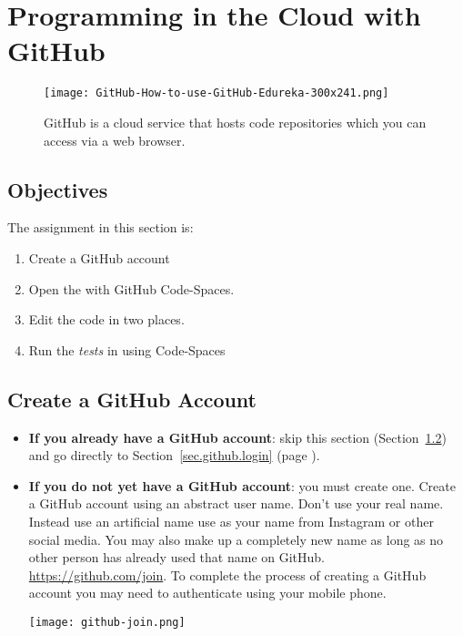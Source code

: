 \section{Programming in the Cloud with GitHub}
\label{sec.github}


\begin{figure}[h]
  \centering
  \texttt{[image: GitHub-How-to-use-GitHub-Edureka-300x241.png]}
  \caption{GitHub is a cloud service that hosts code repositories which 
    you can access via a web browser.}
\end{figure}

\subsection{Objectives}
The assignment in this section is:
\begin{enumerate}
\item Create a GitHub account
\item Open the  with GitHub Code-Spaces.
\item Edit the code in two places.
\item Run the \emph{tests}  in  using Code-Spaces
\end{enumerate}



\clearpage
\subsection{Create a GitHub Account}
\label{sec.account.create}
\begin{itemize}
\item \textbf{If you already have a GitHub account}: skip this section
(Section~\ref{sec.account.create}) and go directly to
Section~\ref{sec.github.login} (page \pageref{sec.github.login}).



\item \textbf{If you do not yet have a GitHub account}: you must create one.
Create a GitHub account using an abstract user name.  Don't use your
real name.  Instead use an artificial name use as your name from
Instagram or other social media.  You may also make up a completely
new name as long as no other person has already used that name on
GitHub.  \url{https://github.com/join}.  To complete the process of
creating a GitHub account you may need to authenticate using your
mobile phone.


\noindent\texttt{[image: github-join.png]}

\end{itemize}

